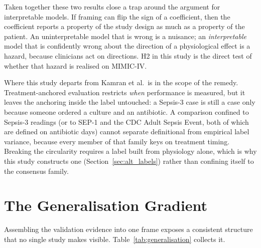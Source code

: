 Taken together these two results close a trap around the argument for
interpretable models. If framing can flip the sign of a coefficient, then the
coefficient reports a property of the study design as much as a property of the
patient. An uninterpretable model that is wrong is a nuisance; an
\emph{interpretable} model that is confidently wrong about the direction of a
physiological effect is a hazard, because clinicians act on directions. H2 in
this study is the direct test of whether that hazard is realised on MIMIC-IV.

Where this study departs from Kamran et al.\ is in the scope of the remedy.
Treatment-anchored evaluation restricts \emph{when} performance is measured,
but it leaves the anchoring inside the label untouched: a Sepsis-3 case is
still a case only because someone ordered a culture and an antibiotic. A
comparison confined to Sepsis-3 readings (or to SEP-1 and the CDC Adult
Sepsis Event, both of which are defined on antibiotic days) cannot separate
definitional from empirical label variance, because every member of that family
keys on treatment timing. Breaking the circularity requires a label built from
physiology alone, which is why this study constructs one
(Section~\ref{sec:alt_labels}) rather than confining itself to the consensus
family.


\section{The Generalisation Gradient}
\label{sec:generalisation}

Assembling the validation evidence into one frame exposes a consistent
structure that no single study makes visible.
Table~\ref{tab:generalisation} collects it.

